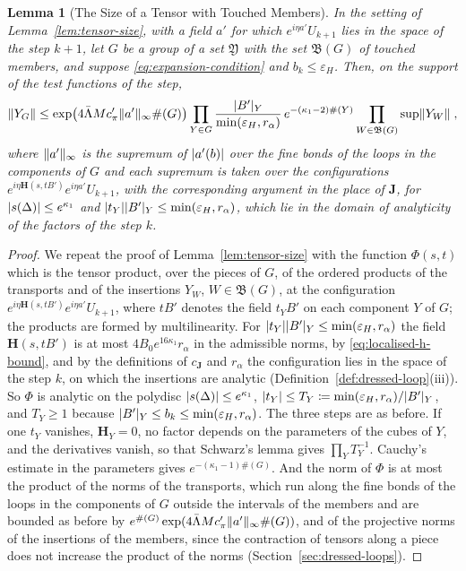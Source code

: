 \documentclass[11pt]{preprint}
\DeclarePairedDelimiter{\abs}{\lvert}{\rvert}
\DeclarePairedDelimiter{\norm}{\lVert}{\rVert}
\numberwithin{equation}{section}
\newtheorem{lemma}[theorem]{Lemma}
\theoremstyle{definition}
\theoremstyle{remark}
\theoremstyle{plain}
\begin{document}
\begin{lemma}[The Size of a Tensor with Touched Members]\label{lem:tensor-members}
In the setting of Lemma~\ref{lem:tensor-size}, with a field $a'$ for which $e^{i\eta a'}U_{k+1}$ lies in the space of the step $k + 1$, let $G$ be a group of a set $\mathfrak Y$ with the set $\mathfrak B(G)$ of touched members, and suppose \eqref{eq:expansion-condition} and $b_k \leq \varepsilon_H$. Then, on the support of the test functions of the step,
\begin{equation}\label{eq:tensor-members}
    \norm{Y_G} \leq \exp\bigl(4\bar\Lambda Mc'_\pi\norm{a'}_\infty\#(G)\bigr)\prod_{Y \in G}\frac{\abs{B'}_Y}{\min(\varepsilon_H, r_\alpha)}\,e^{-(\kappa_1 - 2)\#(Y)}\prod_{W \in \mathfrak B(G)}\sup\norm{Y_W}\;,
\end{equation}
where $\norm{a'}_\infty$ is the supremum of $\abs{a'(b)}$ over the fine bonds of the loops in the components of $G$ and each supremum is taken over the configurations $e^{i\eta\mathbf H(s, tB')}e^{i\eta a'}U_{k+1}$, with the corresponding argument in the place of $\mathbf J$, for $\abs{s(\Delta)} \leq e^{\kappa_1}$ and $\abs{t_Y}\abs{B'}_Y \leq \min(\varepsilon_H, r_\alpha)$, which lie in the domain of analyticity of the factors of the step $k$.
\end{lemma}

\begin{proof}
We repeat the proof of Lemma~\ref{lem:tensor-size} with the function $\Phi(s, t)$ which is the tensor product, over the pieces of $G$, of the ordered products of the transports and of the insertions $Y_W$, $W \in \mathfrak B(G)$, at the configuration $e^{i\eta\mathbf H(s, tB')}e^{i\eta a'}U_{k+1}$, where $tB'$ denotes the field $t_YB'$ on each component $Y$ of $G$; the products are formed by multilinearity. For $\abs{t_Y}\abs{B'}_Y \leq \min(\varepsilon_H, r_\alpha)$ the field $\mathbf H(s, tB')$ is at most $4B_0e^{16\kappa_1}r_\alpha$ in the admissible norms, by \eqref{eq:localised-h-bound}, and by the definitions of $c_{\mathbf J}$ and $r_\alpha$ the configuration lies in the space of the step $k$, on which the insertions are analytic (Definition~\ref{def:dressed-loop}(iii)). So $\Phi$ is analytic on the polydisc $\abs{s(\Delta)} \leq e^{\kappa_1}$, $\abs{t_Y} \leq T_Y \coloneqq \min(\varepsilon_H, r_\alpha)/\abs{B'}_Y$, and $T_Y \geq 1$ because $\abs{B'}_Y \leq b_k \leq \min(\varepsilon_H, r_\alpha)$. The three steps are as before. If one $t_Y$ vanishes, $\mathbf H_Y = 0$, no factor depends on the parameters of the cubes of $Y$, and the derivatives vanish, so that Schwarz's lemma gives $\prod_YT_Y^{-1}$. Cauchy's estimate in the parameters gives $e^{-(\kappa_1 - 1)\#(G)}$. And the norm of $\Phi$ is at most the product of the norms of the transports, which run along the fine bonds of the loops in the components of $G$ outside the intervals of the members and are bounded as before by $e^{\#(G)}\exp(4\bar\Lambda Mc'_\pi\norm{a'}_\infty\#(G))$, and of the projective norms of the insertions of the members, since the contraction of tensors along a piece does not increase the product of the norms (Section~\ref{sec:dressed-loops}).
\end{proof}
\end{document}
